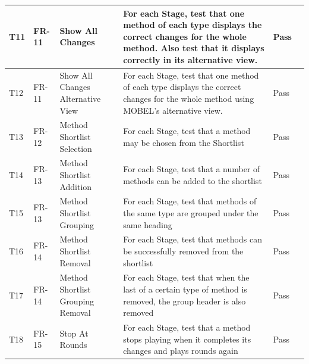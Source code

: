 \documentclass{l4proj}
\begin{document}
\begin{appendices}
\begin{tabular}{| l | p{1.8cm} | p{2.4cm} | p{7.5cm} | p{0.6cm} | p{2.7cm} |}
\hline
T11 & FR-11 & Show All Changes & For each Stage, test that one method of each type displays the correct changes for the whole method. Also test that it displays correctly in its alternative view. & Pass &\\
\hline
T12 & FR-11 & Show All Changes Alternative View & For each Stage, test that one method of each type displays the correct changes for the whole method using MOBEL's alternative view. & Pass &\\
\hline
T13 & FR-12 & Method Shortlist Selection & For each Stage, test that a method may be chosen from the Shortlist & Pass &\\
\hline
T14 & FR-13 & Method Shortlist Addition  & For each Stage, test that a number of methods can be added to the shortlist & Pass &\\
\hline
T15 & FR-13 & Method Shortlist Grouping & For each Stage, test that methods of the same type are grouped under the same heading & Pass & \\
\hline
T16 & FR-14 & Method Shortlist Removal & For each Stage, test that methods can be successfully removed from the shortlist & Pass &\\
\hline
T17 & FR-14 & Method Shortlist Grouping Removal & For each Stage, test that when the last of a certain type of method is removed, the group header is also removed & Pass &\\
\hline
T18 & FR-15 & Stop At Rounds & For each Stage, test that a method stops playing when it completes its changes and plays rounds again& Pass &\\
\hline
\hline
\end{tabular}


\end{appendices}
\end{document}
